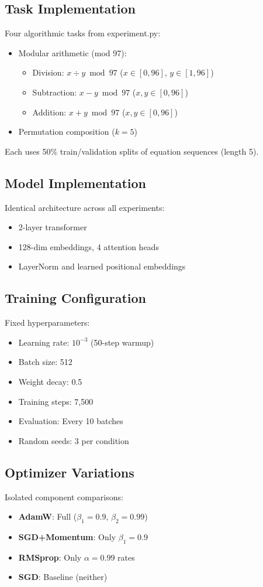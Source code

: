 \documentclass{article} %
\begin{document}
\subsection{Task Implementation}
Four algorithmic tasks from experiment.py:
\begin{itemize}
    \item Modular arithmetic (mod 97):
    \begin{itemize}
        \item Division: $x \div y \bmod 97$ ($x\in[0,96]$, $y\in[1,96]$)
        \item Subtraction: $x - y \bmod 97$ ($x,y\in[0,96]$)
        \item Addition: $x + y \bmod 97$ ($x,y\in[0,96]$)
    \end{itemize}
    \item Permutation composition ($k=5$)
\end{itemize}
Each uses 50\% train/validation splits of equation sequences (length 5).

\subsection{Model Implementation}
Identical architecture across all experiments:
\begin{itemize}
    \item 2-layer transformer \citep{vaswani2017attention}
    \item 128-dim embeddings, 4 attention heads
    \item LayerNorm \citep{ba2016layer} and learned positional embeddings
\end{itemize}

\subsection{Training Configuration}
Fixed hyperparameters:
\begin{itemize}
    \item Learning rate: $10^{-3}$ (50-step warmup)
    \item Batch size: 512
    \item Weight decay: 0.5
    \item Training steps: 7,500
    \item Evaluation: Every 10 batches
    \item Random seeds: 3 per condition
\end{itemize}

\subsection{Optimizer Variations}
Isolated component comparisons:
\begin{itemize}
    \item \textbf{AdamW}: Full ($\beta_1=0.9$, $\beta_2=0.99$)
    \item \textbf{SGD+Momentum}: Only $\beta_1=0.9$
    \item \textbf{RMSprop}: Only $\alpha=0.99$ rates
    \item \textbf{SGD}: Baseline (neither)
\end{itemize}
\end{document}
